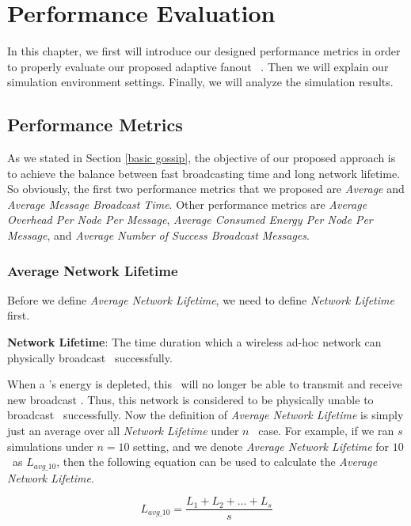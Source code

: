 \chapter{Performance Evaluation}
\label{Chapter5}

In this chapter, we first will introduce our designed performance metrics in order to properly evaluate our proposed adaptive fanout \pp ~\gp. Then we will explain our simulation environment settings. Finally, we will analyze the simulation results.

\section{Performance Metrics}
As we stated in Section \ref{basic gossip}, the objective of our proposed approach is to achieve the balance between fast broadcasting time and long network lifetime. So obviously, the first two performance metrics that we proposed are \emph{Average \nl} and \emph{Average Message Broadcast Time}. Other performance metrics are \emph{Average Overhead Per Node Per Message}, \emph{Average Consumed Energy Per Node Per Message}, and \emph{Average Number of Success Broadcast Messages}.

\subsection{Average Network Lifetime}

Before we define \emph{Average Network Lifetime}, we need to define \emph{Network Lifetime} first. 

\textbf{Network Lifetime}: The time duration which a wireless ad-hoc network can physically broadcast \msgs ~successfully.

When a \gn's energy is depleted, this \gn ~will no longer be able to transmit and receive new broadcast \msgs. Thus, this network is considered to be physically unable to broadcast \msgs ~successfully. Now the definition of \emph{Average Network Lifetime} is simply just an average over all \emph{Network Lifetime} under $n$ \gns ~case. For example, if we ran $s$ simulations under $n=10$ setting, and we denote \emph{Average Network Lifetime} for $10$ \gns ~as $L_{avg\_10}$, then the following equation can be used to calculate the \emph{Average Network Lifetime}.

\[ L_{avg\_10} =\frac{L_1 + L_2 + \ldots + L_{s}}{s} \]

